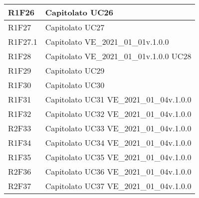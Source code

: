\begin{center}
\begin{longtable}{|p{22mm}|p{44mm}|}
R1F26 &
Capitolato \newline
UC26 
\\
\hline

R1F27 &
Capitolato \newline
UC27 
\\
\hline

R1F27.1 &
Capitolato \newline
VE\_2021\_01\_01v.1.0.0 
\\
\hline

R1F28 &
Capitolato \newline
VE\_2021\_01\_01v.1.0.0 \newline
UC28 
\\
\hline

R1F29 &
Capitolato \newline
UC29 
\\
\hline

R1F30 &
Capitolato \newline
UC30 
\\
\hline

R1F31 &
Capitolato \newline
UC31 \newline
VE\_2021\_01\_04v.1.0.0 
\\
\hline

R1F32 &
Capitolato \newline
UC32 \newline
VE\_2021\_01\_04v.1.0.0 
\\
\hline

R2F33 &
Capitolato \newline
UC33 \newline
VE\_2021\_01\_04v.1.0.0 
\\
\hline

R1F34 &
Capitolato \newline
UC34 \newline
VE\_2021\_01\_04v.1.0.0 
\\
\hline

R1F35 &
Capitolato \newline
UC35 \newline
VE\_2021\_01\_04v.1.0.0 
\\
\hline

R2F36 &
Capitolato \newline
UC36 \newline
VE\_2021\_01\_04v.1.0.0 
\\
\hline

R2F37 &
Capitolato \newline
UC37 \newline
VE\_2021\_01\_04v.1.0.0 
\\
\hline


\end{longtable}
\end{center}
